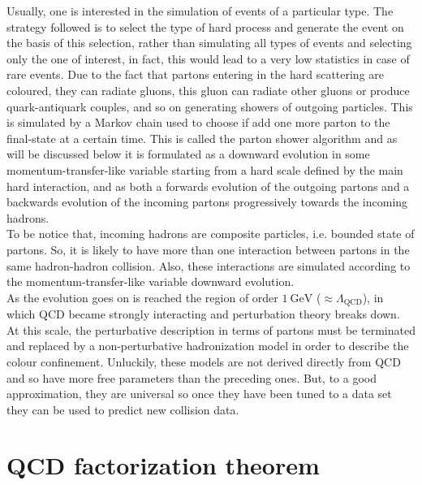 Usually, one is interested in the simulation of events of a particular type. The strategy followed is to select the type of hard process and generate the event on the basis of this selection, rather than simulating all types of events and selecting only the one of interest, in fact, this would lead to a very low statistics in case of rare events. Due to the fact that partons entering in the hard scattering are coloured, they can radiate gluons, this gluon can radiate other gluons or produce quark-antiquark couples, and so on generating showers of outgoing particles. This is simulated by a Markov chain used to choose if add one more parton to the final-state at a certain time. This is called the parton shower algorithm and as will be discussed below it is formulated as a downward evolution in some momentum-transfer-like variable starting from a hard scale defined by the main hard interaction, and as both a forwards evolution of the outgoing 
partons and a backwards evolution of the incoming partons progressively towards the incoming hadrons.
\\
To be notice that, incoming hadrons are composite particles, i.e. bounded state of partons. So, it is likely to have more than one interaction between partons in the same hadron-hadron collision. Also, these interactions are simulated according to the momentum-transfer-like variable downward evolution. 
\\
As the evolution goes on is reached the region of order $1\ \mathrm{GeV}$ ($\approx \Lambda_{\text{QCD}}$), in which QCD became strongly interacting and perturbation theory breaks down. At this scale, the perturbative description in terms of partons must be terminated and replaced by a non-perturbative hadronization model in order to describe the colour confinement. Unluckily, these models are not derived directly from QCD and so have more free parameters than the preceding ones. But, to a good approximation, they are universal so once they have been tuned to a data set they can be used to predict new collision data. 









\section{QCD factorization theorem}

